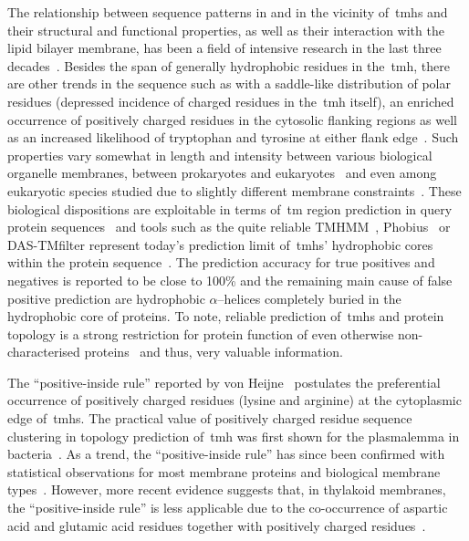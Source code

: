 The relationship between sequence patterns in and in the vicinity of~\gls{tmh}s and their structural and functional properties, as well as their interaction with the lipid bilayer membrane, has been a field of intensive research in the last three decades~\cite{Ladokhin2015}.
Besides the span of generally hydrophobic residues in the~\gls{tmh}, there are other trends in the sequence such as with a saddle-like distribution of polar residues (depressed incidence of charged residues in the~\gls{tmh}  itself), an enriched occurrence of positively charged residues in the cytosolic flanking regions as well as an increased likelihood of tryptophan and tyrosine at either flank edge~\cite{Sharpe2010, VonHeijne1986,VonHeijne1988,VonHeijne1989, Baeza-Delgado2013, Granseth2005}.
Such properties vary somewhat in length and intensity between various biological organelle membranes, between prokaryotes and eukaryotes~\cite{Ojemalm2013} and even among eukaryotic species studied due to slightly different membrane constraints~\cite{Sharpe2010, Pogozheva2013}.
These biological dispositions are exploitable in terms of~\gls{tm} region prediction in query protein sequences~\cite{Beuming2004, Zhao2006} and tools such as the quite reliable TMHMM~\cite{Krogh2001,Sonnhammer1998}, Phobius~\cite{Kall2004, Kall2007} or DAS-TMfilter represent today’s prediction limit of~\gls{tmh}s’ hydrophobic cores within the protein sequence~\cite{Cserzo2002, Cserzo2004, Kall2002}.
The prediction accuracy for true positives and negatives is reported to be close to 100\% and the remaining main cause of false positive prediction are hydrophobic \(\alpha\)--helices completely buried in the hydrophobic core of proteins.
 To note, reliable prediction of~\gls{tmh}s and protein topology is a strong restriction for protein function of even otherwise non\--characterised proteins~\cite{Eisenhaber2016, Eisenhaber2012, Sherman2015} and thus, very valuable information.

The ``positive\--inside rule'' reported by von Heijne~\cite{VonHeijne2006, VonHeijne1989} postulates the preferential occurrence of positively charged residues (lysine and arginine) at the cytoplasmic edge of~\gls{tmh}s.
The practical value of positively charged residue sequence clustering in topology prediction of~\gls{tmh} was first shown for the plasmalemma in bacteria~\cite{VonHeijne1989, Sipos1993}.
As a trend, the ``positive-inside rule'' has since been confirmed with statistical observations for most membrane proteins and biological membrane types~\cite{Baeza-Delgado2013, Gavel1991, Nilsson2005a, Wallin1998}.
However, more recent evidence suggests that, in thylakoid membranes, the ``positive-inside rule'' is less applicable due to the co-occurrence of aspartic acid and glutamic acid residues together with positively charged residues~\cite{Pogozheva2013}.

